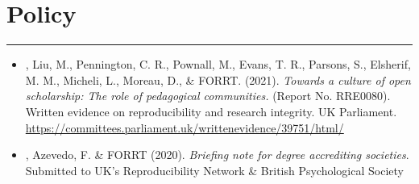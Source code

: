 \documentclass[letterpaper]{article}
\begin{document}
\section*{\color{Brown} Policy}
\vspace{-0.5em}
\hrule
\vspace{1em}
\begin{itemize}
\vspace{0.25em}

\item[]{, Liu, M., Pennington, C. R., Pownall, M., Evans, T. R., Parsons, S., Elsherif, M. M., Micheli, L., Moreau, D., \& FORRT. (2021). {\it Towards a culture of open scholarship: The role of pedagogical communities.} (Report No. RRE0080). Written evidence on reproducibility and research integrity. UK Parliament. \href{https://committees.parliament.uk/writtenevidence/39751/html/}{\color{BlueViolet}https://committees.parliament.uk/writtenevidence/39751/html/} {} {\color{BlueViolet}{[\href{https://committees.parliament.uk/work/1433/reproducibility-and-research-integrity/publications/written-evidence/?SearchTerm=FORRT&DateFrom=&DateTo=&SessionId=}{\color{BlueViolet}{UK Parliament Publication}}]}}}

\item[]{, Azevedo, F. \& FORRT (2020). {\it Briefing note for degree accrediting societies}. Submitted to UK’s Reproducibility Network \& British Psychological Society  {}}


\end{itemize}
\end{document}
